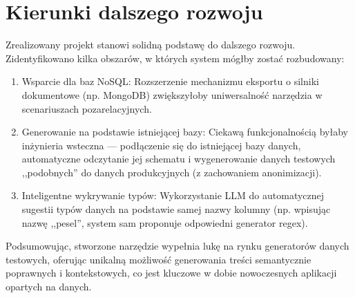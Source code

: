 \section{Kierunki dalszego rozwoju}
Zrealizowany projekt stanowi solidną podstawę do dalszego rozwoju. Zidentyfikowano kilka obszarów, w których system mógłby zostać rozbudowany:
\begin{enumerate}
    \item Wsparcie dla baz NoSQL: Rozszerzenie mechanizmu eksportu o silniki dokumentowe (np. MongoDB) zwiększyłoby uniwersalność narzędzia w scenariuszach pozarelacyjnych.
    \item Generowanie na podstawie istniejącej bazy: Ciekawą funkcjonalnością byłaby inżynieria wsteczna --- podłączenie się do istniejącej bazy danych, automatyczne odczytanie jej schematu i wygenerowanie danych testowych ,,podobnych'' do danych produkcyjnych (z zachowaniem anonimizacji).
    \item Inteligentne wykrywanie typów: Wykorzystanie \gls{LLM} do automatycznej sugestii typów danych na podstawie samej nazwy kolumny (np. wpisując nazwę ,,pesel'', system sam proponuje odpowiedni generator regex).
\end{enumerate}

Podsumowując, stworzone narzędzie wypełnia lukę na rynku generatorów danych testowych, oferując unikalną możliwość generowania treści semantycznie poprawnych i kontekstowych, co jest kluczowe w dobie nowoczesnych aplikacji opartych na danych.
